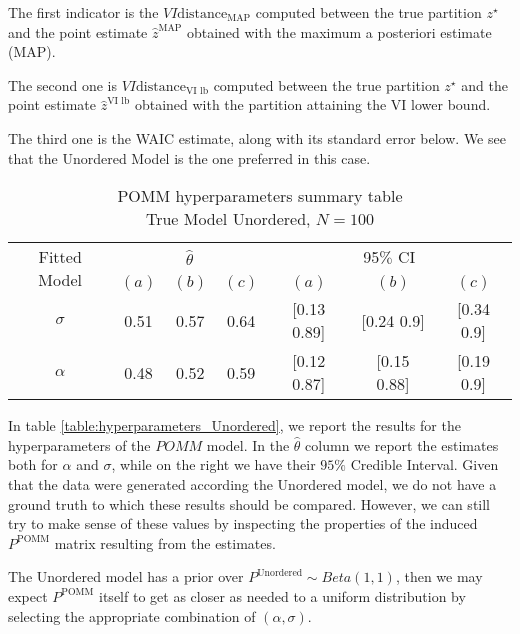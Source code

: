 \documentclass[11pt]{amsart}
\begin{document}
The first indicator is the $VI \text{distance}_{\text{MAP}}$ computed between the true partition $z^\star$ and the point estimate $\hat{z}^{\text{MAP}}$ obtained with the maximum a posteriori estimate (MAP).

The second one is $VI \text{distance}_{\text{VI lb}}$ computed between the true partition $z^\star$ and the point estimate $\hat{z}^{\text{VI lb}}$ obtained with the partition attaining the VI lower bound.

The third one is the WAIC estimate, along with its standard error below. We see that the Unordered Model is the one preferred in this case.



\begin{table}[htbp]
\centering
\caption{
{\large POMM hyperparameters summary table} \\ 
{\small True Model Unordered, $N=100$}
} 
\begin{tabular}{ccccccc}
\toprule
\multirow{2}{*}{Fitted Model} & \multicolumn{3}{c}{
$\hat{\theta}$} & \multicolumn{3}{c}{95$\%$ CI} \\
\cmidrule(lr){2-4} \cmidrule(lr){5-7} 
& $(a)$ & $(b)$ & $(c)$ & $(a)$ & $(b)$ & $(c)$  \\
\midrule
$\sigma$  & 0.51 & 0.57 & 0.64 & [0.13	0.89] & [0.24	0.9] & [0.34	0.9]   \\
$\alpha$ & 0.48 & 0.52 & 0.59 & [0.12	0.87] & [0.15	0.88] & [0.19	0.9] \\
\bottomrule
\end{tabular}
\label{table:hyperparameters_Unordered}
\end{table}


In table \eqref{table:hyperparameters_Unordered}, we report the results for the hyperparameters of the $POMM$ model. In the $\hat{\theta}$ column we report the estimates both for $\alpha$ and $\sigma$, while on the right we have their $95\%$ Credible Interval.
Given that the data were generated according the Unordered model, we do not have a ground truth to which these results should be compared. However, we can still try to make sense of these values by inspecting the properties of the induced $P^{\text{POMM}}$ matrix resulting from the estimates.

The Unordered model has a prior over $P^{\text{Unordered}} \sim Beta(1,1)$, then we may expect $P^{\text{POMM}}$ itself to get as closer as needed to a uniform distribution by selecting the appropriate combination of $(\alpha, \sigma)$. 


\clearpage
\end{document}
